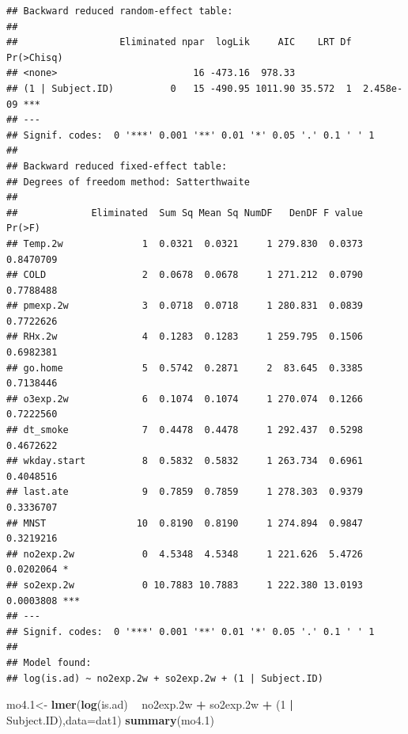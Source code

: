 \documentclass[12pt,]{article}
\newenvironment{Shaded}{\begin{snugshade}}{\end{snugshade}}
\newcommand{\DataTypeTok}[1]{\textcolor[rgb]{0.13,0.29,0.53}{#1}}
\newcommand{\DecValTok}[1]{\textcolor[rgb]{0.00,0.00,0.81}{#1}}
\newcommand{\FloatTok}[1]{\textcolor[rgb]{0.00,0.00,0.81}{#1}}
\newcommand{\KeywordTok}[1]{\textcolor[rgb]{0.13,0.29,0.53}{\textbf{#1}}}
\newcommand{\NormalTok}[1]{#1}
\newcommand{\OperatorTok}[1]{\textcolor[rgb]{0.81,0.36,0.00}{\textbf{#1}}}
\newcommand{\StringTok}[1]{\textcolor[rgb]{0.31,0.60,0.02}{#1}}
\begin{document}
\begin{verbatim}
## Backward reduced random-effect table:
## 
##                  Eliminated npar  logLik     AIC    LRT Df Pr(>Chisq)    
## <none>                        16 -473.16  978.33                         
## (1 | Subject.ID)          0   15 -490.95 1011.90 35.572  1  2.458e-09 ***
## ---
## Signif. codes:  0 '***' 0.001 '**' 0.01 '*' 0.05 '.' 0.1 ' ' 1
## 
## Backward reduced fixed-effect table:
## Degrees of freedom method: Satterthwaite 
## 
##             Eliminated  Sum Sq Mean Sq NumDF   DenDF F value    Pr(>F)    
## Temp.2w              1  0.0321  0.0321     1 279.830  0.0373 0.8470709    
## COLD                 2  0.0678  0.0678     1 271.212  0.0790 0.7788488    
## pmexp.2w             3  0.0718  0.0718     1 280.831  0.0839 0.7722626    
## RHx.2w               4  0.1283  0.1283     1 259.795  0.1506 0.6982381    
## go.home              5  0.5742  0.2871     2  83.645  0.3385 0.7138446    
## o3exp.2w             6  0.1074  0.1074     1 270.074  0.1266 0.7222560    
## dt_smoke             7  0.4478  0.4478     1 292.437  0.5298 0.4672622    
## wkday.start          8  0.5832  0.5832     1 263.734  0.6961 0.4048516    
## last.ate             9  0.7859  0.7859     1 278.303  0.9379 0.3336707    
## MNST                10  0.8190  0.8190     1 274.894  0.9847 0.3219216    
## no2exp.2w            0  4.5348  4.5348     1 221.626  5.4726 0.0202064 *  
## so2exp.2w            0 10.7883 10.7883     1 222.380 13.0193 0.0003808 ***
## ---
## Signif. codes:  0 '***' 0.001 '**' 0.01 '*' 0.05 '.' 0.1 ' ' 1
## 
## Model found:
## log(is.ad) ~ no2exp.2w + so2exp.2w + (1 | Subject.ID)
\end{verbatim}

\begin{Shaded}
\begin{Highlighting}[]
\NormalTok{mo4}\FloatTok{.1}\NormalTok{<-}\StringTok{ }\KeywordTok{lmer}\NormalTok{(}\KeywordTok{log}\NormalTok{(is.ad) }\OperatorTok{~}\StringTok{ }\NormalTok{no2exp}\FloatTok{.2}\NormalTok{w }\OperatorTok{+}\StringTok{ }\NormalTok{so2exp}\FloatTok{.2}\NormalTok{w }\OperatorTok{+}\StringTok{ }\NormalTok{(}\DecValTok{1} \OperatorTok{|}\StringTok{ }\NormalTok{Subject.ID),}\DataTypeTok{data=}\NormalTok{dat1)}
\KeywordTok{summary}\NormalTok{(mo4}\FloatTok{.1}\NormalTok{)}
\end{Highlighting}
\end{Shaded}
\end{document}
